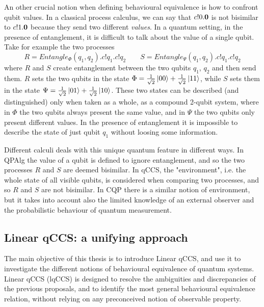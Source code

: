  An other crucial notion when defining behavioural equivalence is how to confront qubit values. In a classical process calculus, we can say that $c!0.\mathbf{0}$ is not bisimilar to $c!1.\mathbf{0}$ because they send two different \textit{values}. In a quantum setting, in the presence of entanglement, it is difficult to talk about the value of a single qubit.  Take for example the two processes 
 \[R = Entangle_{\Phi}(q_1, q_2).c!q_1.c!q_2 \qquad 
   S = Entangle_{\Psi}(q_1, q_2).c!q_1.c!q_2\]
where $R$ and $S$ create entanglement between the two qubits  $q_1$, $q_2$ and then send them. $R$ sets the two qubits in the state $\Phi = \frac{1}{\sqrt{2}}\ket{00} + \frac{1}{\sqrt{2}}\ket{11}$, while $S$ sets them in the state $\Psi = \frac{1}{\sqrt{2}}\ket{01} + \frac{1}{\sqrt{2}}\ket{10}$. These two states can be described (and distinguished) only when taken as a whole, as a compound 2-qubit system, where in $\Phi$ the two qubits always present the same value, and in $\Psi$ the two qubits only present different values. In the presence of entanglement it is impossible to describe the state of just qubit $q_1$ without loosing some information.
 
Different calculi deals with this unique quantum feature in different ways. In QPAlg the value of a qubit is defined to ignore entanglement, and so the two processes $R$ and $S$ are deemed bisimilar. In qCCS, the "environment", i.e. the whole state of all visible qubits, is considered when comparing two processes, and so $R$ and $S$ are not bisimilar. In CQP there is a similar notion of environment, but it takes into account also the limited knowledge of an external observer and the probabilistic behaviour of quantum measurement.
 
\subsection*{Linear qCCS: a unifying approach}
The main objective of this thesis is to introduce Linear qCCS, and use it to investigate the different notions of behavioural equivalence of quantum systems. Linear qCCS (lqCCS) is designed to resolve the ambiguities and discrepancies of the previous proposals, and to identify the most general behavioural equivalence relation, without relying on any preconceived notion of observable property.

